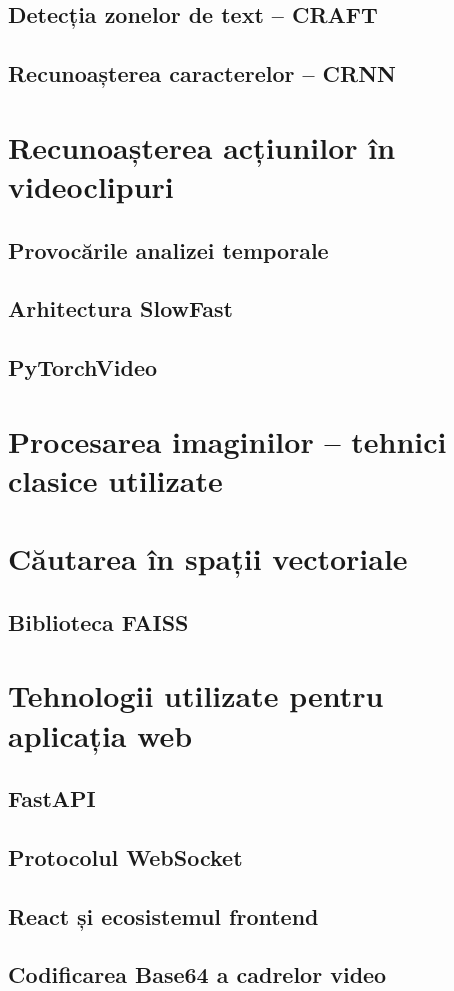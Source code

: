 \documentclass[../../main.tex]{subfiles}
\begin{document}
\subsection{Detecția zonelor de text -- CRAFT}
\label{subsec:craft}

\subsection{Recunoașterea caracterelor -- CRNN}
\label{subsec:crnn}

\section{Recunoașterea acțiunilor în videoclipuri}
\label{sec:actiuni}

\subsection{Provocările analizei temporale}
\label{subsec:provocari_temporal}

\subsection{Arhitectura SlowFast}
\label{subsec:slowfast}

\subsection{PyTorchVideo}
\label{subsec:pytorchvideo}

\section{Procesarea imaginilor -- tehnici clasice utilizate}
\label{sec:procesare_imagini}

\section{Căutarea în spații vectoriale}
\label{sec:cautare_vectoriala}

\subsection{Biblioteca FAISS}
\label{subsec:faiss}

\section{Tehnologii utilizate pentru aplicația web}
\label{sec:tehnologii_web}

\subsection{FastAPI}
\label{subsec:fastapi}

\subsection{Protocolul WebSocket}
\label{subsec:websocket}

\subsection{React și ecosistemul frontend}
\label{subsec:react}

\subsection{Codificarea Base64 a cadrelor video}
\label{subsec:base64}
\end{document}
